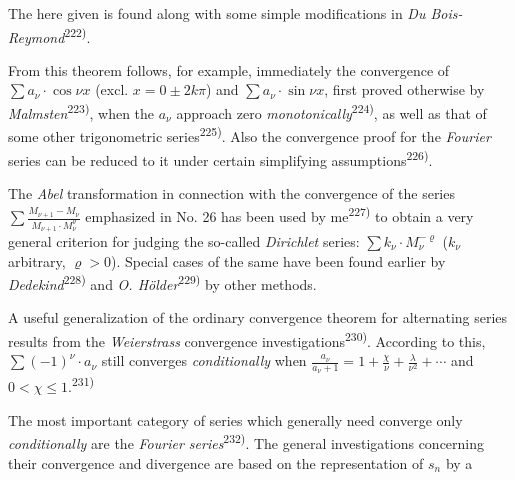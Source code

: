 \thispagestyle{fancy}

\vspace{0.5cm}

The here given is found along with some simple modifications in \textit{Du Bois-Reymond}\textsuperscript{222)}.

From this theorem follows, for example, immediately the convergence of $\sum a_\nu \cdot \cos \nu x$ (excl. $x = 0 \pm 2k\pi$) and $\sum a_\nu \cdot \sin \nu x$, first proved otherwise by \textit{Malmsten}\textsuperscript{223)}, when the $a_\nu$ approach zero \textit{monotonically}\textsuperscript{224)}, as well as that of some other trigonometric series\textsuperscript{225)}. Also the convergence proof for the \textit{Fourier} series can be reduced to it under certain simplifying assumptions\textsuperscript{226)}.

The \textit{Abel} transformation in connection with the convergence of the series $\sum \frac{M_{\nu+1} - M_\nu}{M_{\nu+1} \cdot M_\nu^\varrho}$ emphasized in No. 26 has been used by me\textsuperscript{227)} to obtain a very general criterion for judging the so-called \textit{Dirichlet} series: $\sum k_\nu \cdot M_\nu^{-\varrho}$ ($k_\nu$ arbitrary, $\varrho > 0$). Special cases of the same have been found earlier by \textit{Dedekind}\textsuperscript{228)} and \textit{O. Hölder}\textsuperscript{229)} by other methods.

A useful generalization of the ordinary convergence theorem for alternating series results from the \textit{Weierstrass} convergence investigations\textsuperscript{230)}. According to this, $\sum (-1)^\nu \cdot a_\nu$ still converges \textit{conditionally} when $\frac{a_\nu}{a_\nu+1} = 1 + \frac{\chi}{\nu} + \frac{\lambda}{\nu^2} + \cdots$ and $0 < \chi \leq 1$.\textsuperscript{231)}

The most important category of series which generally need converge only \textit{conditionally} are the \textit{Fourier series}\textsuperscript{232)}. The general investigations concerning their convergence and divergence are based on the representation of $s_n$ by a

